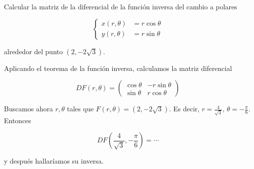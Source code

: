 \begin{problem}[9]
Calcular la matriz de la diferencial de la función inversa del cambio a polares

\[ \begin{cases}
x(r,θ) &= r\cos θ \\
y(r,θ) &= r\sin θ
\end{cases} \]

alrededor del punto $(2, -2\sqrt{3})$.

\solution

Aplicando el teorema de la función inversa, calculamos la matriz diferencial

\[  DF(r,θ) = \begin{pmatrix}
\cos θ & - r \sin θ \\
\sin θ & r \cos θ 
\end{pmatrix} \]

Buscamos ahora $r,θ$ tales que $F(r,θ) = (2, -2\sqrt{3})$. Es decir, $r=\frac{4}{\sqrt{3}},\,θ = -\frac{\pi }{6}$. Entonces

\[ DF\left(\frac{4}{\sqrt{3}}, -\frac{\pi }{6}\right) = \dotsb \]

y después hallaríamos su inversa.

\end{problem}    
                         
